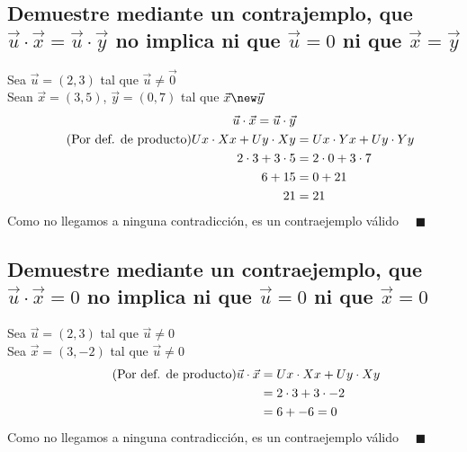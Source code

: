 \documentclass[14pt]{extarticle}
\begin{document}
    \subsection{Demuestre mediante un contrajemplo, que $\vec{u}\cdot\vec{x} = \vec{u}\cdot\vec{y}$ no implica ni que $\vec{u} = 0$ ni que $\vec{x} = \vec{y}$}
        Sea $\vec{u} = (2,3)$ tal que $\vec{u} \neq \vec{0}$ \\
        Sean $\vec{x} = (3,5)$, $\vec{y} = (0,7)$ tal que $\vec{x}\new\vec{y}$ \\
        \begin{align}
            \notag \vec{u} \cdot \vec{x} = \vec{u} \cdot \vec{y} \\
            \tag{Por def. de producto} Ux\cdot Xx + Uy \cdot Xy &= Ux\cdot Yx + Uy \cdot Yy \\
            \notag 2 \cdot 3 + 3\cdot 5 &= 2 \cdot 0 + 3\cdot 7 \\
            \notag 6 + 15 &= 0 + 21 \\
            \notag 21 &= 21
        \end{align}
        Como no llegamos a ninguna contradicción, es un contraejemplo válido $\quad \blacksquare$
    \subsection{Demuestre mediante un contraejemplo, que $\vec{u}\cdot\vec{x}=0$ no implica ni que $\vec{u} = 0$ ni que $ \vec{x} = 0$}
        Sea $\vec{u} = (2,3)$ tal que $\vec{u} \neq 0$ \\
        Sea $\vec{x} = (3,-2)$ tal que $\vec{u} \neq 0$
        \begin{align}
            \tag{Por def. de producto} \vec{u}\cdot\vec{x} &=Ux\cdot Xx + Uy \cdot Xy \\
            \notag &= 2 \cdot 3 + 3 \cdot -2 \\
            \notag &= 6 + -6 = 0
        \end{align}
          Como no llegamos a ninguna contradicción, es un contraejemplo válido $\quad \blacksquare$
\end{document}
